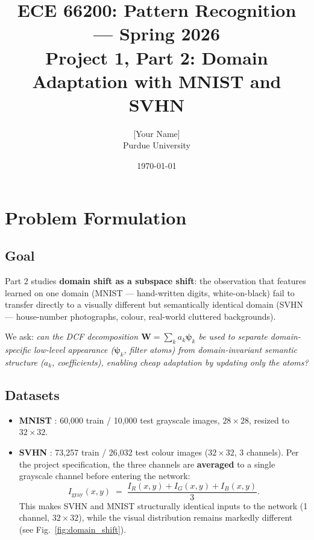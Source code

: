 \documentclass[11pt,letterpaper]{article}
\title{\textbf{ECE 66200: Pattern Recognition — Spring 2026}\\[4pt]
       \Large Project 1, Part 2: Domain Adaptation with MNIST and SVHN}
\author{[Your Name] \\ Purdue University}
\date{\today}
\newcommand{\W}{\mathbf{W}}
\newcommand{\psivec}{\boldsymbol{\psi}}
\begin{document}
\maketitle
\tableofcontents
\newpage

\section{Problem Formulation}
\label{sec:formulation}

\subsection{Goal}

Part 2 studies \textbf{domain shift as a subspace shift}: the observation that
features learned on one domain (MNIST — hand-written digits, white-on-black)
fail to transfer directly to a visually different but semantically identical
domain (SVHN — house-number photographs, colour, real-world cluttered
backgrounds).

We ask: \emph{can the DCF decomposition $\W = \sum_k a_k \psivec_k$ be used
to separate domain-specific low-level appearance ($\psivec_k$, filter atoms)
from domain-invariant semantic structure ($a_k$, coefficients), enabling cheap
adaptation by updating only the atoms?}

\subsection{Datasets}

\begin{itemize}[leftmargin=*]
  \item \textbf{MNIST} \cite{lecun1998gradient}: 60{,}000 train / 10{,}000 test
        grayscale images, $28{\times}28$, resized to $32{\times}32$.
  \item \textbf{SVHN} \cite{netzer2011reading}: 73{,}257 train / 26{,}032 test
        colour images ($32{\times}32$, 3 channels).  Per the project
        specification, the three channels are \textbf{averaged} to a single
        grayscale channel before entering the network:
        \begin{equation}
          I_{\text{gray}}(x,y) \;=\;
          \frac{I_R(x,y) + I_G(x,y) + I_B(x,y)}{3}.
        \end{equation}
        This makes SVHN and MNIST structurally identical inputs to the network
        (1 channel, $32{\times}32$), while the visual distribution remains
        markedly different (see Fig.~\ref{fig:domain_shift}).
\end{itemize}
\end{document}
